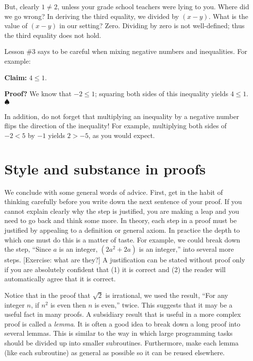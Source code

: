\documentclass[11pt]{article}
\begin{document}
But, clearly $1\neq 2$, unless your grade school teachers were lying to you. Where did we go wrong? In deriving the third equality, we divided by $(x-y)$. What is the value of $(x-y)$ in our setting? Zero. Dividing by zero is not well-defined; thus the third equality does not hold.

Lesson \#3 says to be careful when mixing negative numbers and inequalities. For example:

\textbf{Claim:} $4 \leq 1$.

\textbf{Proof?} We know that $-2\leq 1$; squaring both sides of this inequality yields $4 \leq 1$. $\spadesuit$


In addition, do not forget that multiplying an inequality by a negative number flips the direction of the inequality! For example, multiplying both sides of $-2 < 5$ by $-1$ yields $2 > -5$, as you would expect.


\section{Style and substance in proofs}\label{scn:style}

\iffalse
1. convince yourself that you have a waterproof, solid, rigorous convincing proof.
2. Communicate that it is rigorous. 
\fi

We conclude with some general words of advice.
First, get in the habit of thinking carefully before you write down
the next sentence of your proof. If you cannot explain clearly why
the step is justified, you are making a leap and you need to go
back and think some more. In theory, each step in a proof must be
justified by appealing to a definition or general axiom.
In practice the depth to which one must do this
is a matter of taste. For example, we could
break down the step, ``Since $a$ is an integer, $(2a^2 + 2a)$ is an
integer,'' into several more steps. [Exercise: what are they?]
A justification can be stated without proof only if you are
absolutely confident that (1) it is correct and (2) the reader
will automatically agree that it is correct.

Notice that in the proof that $\sqrt{2}$ is irrational, we used the
result, ``For any integer $n$, if $n^2$ is even then $n$ is
even,'' twice. This suggests that it may be a useful fact in many
proofs. A subsidiary result that is useful in a more complex proof is
called a {\it lemma}. It is often a good idea to break down a long
proof into several lemmas. This
is similar to the way in which large programming tasks should be
divided up into smaller subroutines.  Furthermore, make each lemma
(like each subroutine) as general as possible so it can be reused
elsewhere.
\end{document}
